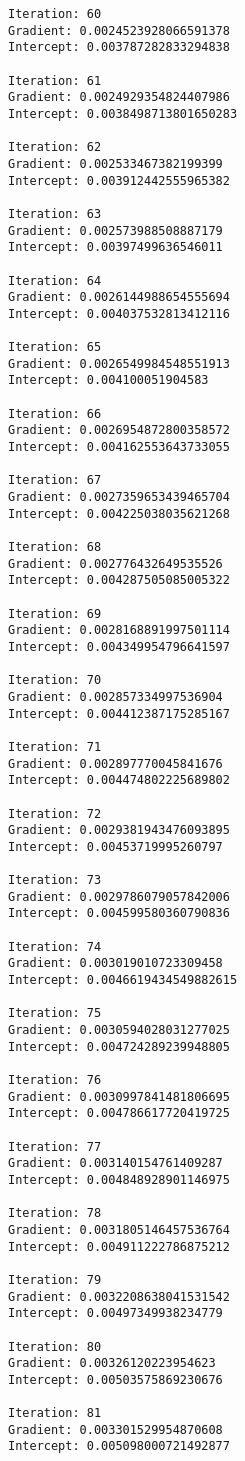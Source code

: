 \documentclass[11pt]{article}
\begin{document}
\begin{Verbatim}[commandchars=\\\{\}]
Iteration: 60 
Gradient: 0.0024523928066591378 
Intercept: 0.003787282833294838 

Iteration: 61 
Gradient: 0.0024929354824407986 
Intercept: 0.0038498713801650283 

Iteration: 62 
Gradient: 0.002533467382199399 
Intercept: 0.003912442555965382 

Iteration: 63 
Gradient: 0.002573988508887179 
Intercept: 0.00397499636546011 

Iteration: 64 
Gradient: 0.0026144988654555694 
Intercept: 0.004037532813412116 

Iteration: 65 
Gradient: 0.0026549984548551913 
Intercept: 0.004100051904583 

Iteration: 66 
Gradient: 0.0026954872800358572 
Intercept: 0.004162553643733055 

Iteration: 67 
Gradient: 0.0027359653439465704 
Intercept: 0.004225038035621268 

Iteration: 68 
Gradient: 0.002776432649535526 
Intercept: 0.004287505085005322 

Iteration: 69 
Gradient: 0.0028168891997501114 
Intercept: 0.004349954796641597 

Iteration: 70 
Gradient: 0.002857334997536904 
Intercept: 0.004412387175285167 

Iteration: 71 
Gradient: 0.002897770045841676 
Intercept: 0.004474802225689802 

Iteration: 72 
Gradient: 0.0029381943476093895 
Intercept: 0.00453719995260797 

Iteration: 73 
Gradient: 0.0029786079057842006 
Intercept: 0.004599580360790836 

Iteration: 74 
Gradient: 0.003019010723309458 
Intercept: 0.0046619434549882615 

Iteration: 75 
Gradient: 0.0030594028031277025 
Intercept: 0.004724289239948805 

Iteration: 76 
Gradient: 0.0030997841481806695 
Intercept: 0.004786617720419725 

Iteration: 77 
Gradient: 0.003140154761409287 
Intercept: 0.004848928901146975 

Iteration: 78 
Gradient: 0.0031805146457536764 
Intercept: 0.004911222786875212 

Iteration: 79 
Gradient: 0.0032208638041531542 
Intercept: 0.00497349938234779 

Iteration: 80 
Gradient: 0.00326120223954623 
Intercept: 0.00503575869230676 

Iteration: 81 
Gradient: 0.003301529954870608 
Intercept: 0.005098000721492877 


\end{Verbatim}
\end{document}
